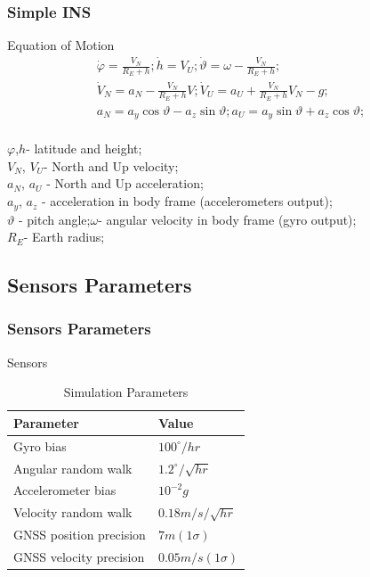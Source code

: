 \documentclass[compress]{beamer}    %
\begin{document}
\begin{frame}
\frametitle{Simple INS}
\begin{block}{Equation of Motion}
\begin{equation}
\begin{array}{l}
  \displaystyle \dot{\varphi }=\frac{V_{N} }{R_{E} +h} ; \dot{h}=V_{U} ; \dot{\vartheta }=\omega -\frac{V_{N} }{R_{E} +h} ;\\
  \displaystyle \dot{V}_{N} =a_{N} -\frac{V_{N} }{R_{E} +h} V; \dot{V}_{U} =a_{U} +\frac{V_{N} }{R_{E} +h} V_{N} -g;\\
  \displaystyle a_{N} =a_{y} \cos \vartheta -a_{z} \sin \vartheta ; a_{U} =a_{y} \sin \vartheta +a_{z} \cos \vartheta ;\\
  \end{array} 
  \label{eq:ins}
\end{equation}
\end{block}
$\varphi$,$h$- latitude and height; \\
$V_{N}$, $V_{U}$- North and Up velocity; \\
$a_{N}$, $a_{U}$ - North and Up acceleration; \\
$a_{y}$, $a_{z}$ - acceleration in body frame (accelerometers output); \\
$\vartheta$ - pitch angle;$\omega $- angular velocity in body frame (gyro output); \\
$R_{E}$- Earth radius;
\end{frame}

\subsection{Sensors Parameters}
\begin{frame}
\frametitle{Sensors Parameters}
\begin{block}{Sensors}
\begin{table}%
\centering
\centering
\renewcommand{\arraystretch}{1.3}
  \caption{Simulation Parameters}
    \begin{tabular}{|l|p{50mm}|} \hline 
      Parameter & Value \\ \hline  \hline 
      Gyro bias & $100^{\circ } /hr$ \\ \hline 
      Angular random walk & $1.2^{\circ } /\sqrt{hr} $ \\ \hline 
      Accelerometer bias & $10^{-2} g$ \\ \hline 
      Velocity random walk & $0.18m/s/\sqrt{hr} $ \\ \hline 
      GNSS position precision & $7m(1\sigma )$ \\ \hline 
      GNSS velocity precision & $0.05m/s(1\sigma )$ \\ \hline 
    \end{tabular}
  \label{tab:sim}
\end{table}
\end{block}
\end{frame}
\end{document}
